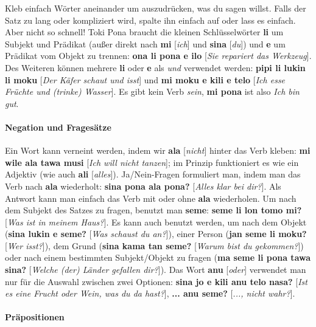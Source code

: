 \documentclass[10pt,a4paper]{article}
\begin{document}
\begin{multicols}{2}
Kleb einfach Wörter aneinander um auszudrücken, was du sagen willst. Falls der Satz zu lang oder kompliziert wird, spalte ihn einfach auf oder lass es einfach. Aber nicht so schnell! Toki Pona braucht die kleinen Schlüsselwörter \textbf{li} um Subjekt und Prädikat (außer direkt nach \textbf{mi} [\textit{ich}] und \textbf{sina} [\textit{du}]) und \textbf{e} um Prädikat vom Objekt zu trennen: \textbf{ona li pona e ilo} [\textit{Sie repariert das Werkzeug}]. Des Weiteren können mehrere \textbf{li} oder \textbf{e} als \textit{und} verwendet werden: \textbf{pipi li lukin li moku} [\textit{Der Käfer schaut und isst}] und \textbf{mi moku e kili e telo} [\textit{Ich esse Früchte und (trinke) Wasser}]. Es gibt kein Verb \textit{sein}, \textbf{mi pona} ist also \textit{Ich bin gut}.

\paragraph{Negation und Fragesätze}

Ein Wort kann verneint werden, indem wir \textbf{ala} [\textit{nicht}] hinter das Verb kleben: \textbf{mi wile ala tawa musi} [\textit{Ich will nicht tanzen}]; im Prinzip funktioniert es wie ein Adjektiv (wie auch \textbf{ali} [\textit{alles}]). Ja/Nein-Fragen formuliert man, indem man das Verb nach \textbf{ala} wiederholt: \textbf{sina pona ala pona?} [\textit{Alles klar bei dir?}]. Als Antwort kann man einfach das Verb mit oder ohne \textbf{ala} wiederholen. Um nach dem Subjekt des Satzes zu fragen, benutzt man \textbf{seme}: \textbf{seme li lon tomo mi?} [\textit{Was ist in meinem Haus?}]. Es kann auch benutzt werden, um nach dem Objekt (\textbf{sina lukin e seme?} [\textit{Was schaust du an?}]), einer Person (\textbf{jan seme li moku?} [\textit{Wer isst?}]), dem Grund (\textbf{sina kama tan seme?} [\textit{Warum bist du gekommen?}]) oder nach einem bestimmten Subjekt/Objekt zu fragen (\textbf{ma seme li pona tawa sina?} [\textit{Welche (der) Länder gefallen dir?}]). Das Wort \textbf{anu} [\textit{oder}] verwendet man nur für die Auswahl zwischen zwei Optionen: \textbf{sina jo e kili anu telo nasa?} [\textit{Ist es eine Frucht oder Wein, was du da hast?}], \textbf{... anu seme?} [\textit{..., nicht wahr?}].
\end{multicols}

\paragraph{Präpositionen}
\end{document}
